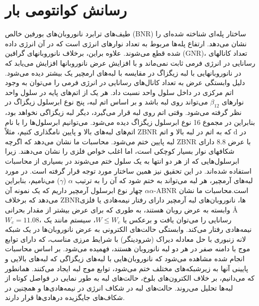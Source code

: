 \section{رسانش کوانتو‌‌می‌‌ بار}
طیف‌های ترابرد نانوروبان‌های ‌بورفین خالص (\gls{BNR}) ساختار پله‌ای شناخته شده‌ای را نشان ‌‌می‌‌دهد. ارتفاع پله‌ها مربوط به تعداد نوارهای انرژی است که در آن انرژی داده شده قطع ‌‌می‌‌شوند. علاوه بر‌این، برخلاف نانوروبانهای گرافین (\gls{GNR})، تعداد کانالهای رسانایی در انرژی فر‌‌می‌‌ ثابت نمی‌‌ماند و با افزایش عرض نانوروبانها افزایش ‌می‌‌یابد که در نانوروبانهایی با لبه زیگزاگ در مقایسه با لبه‌های ارمچیر یک بیشتر دیده ‌می‌شود. دلیل وابستگی عرض به تعداد کانال‌های رسانایی در انرژی فر‌‌می‌‌ را ‌‌می‌‌توان به وجود اتم مرکزی در داخل سلول واحد نسبت داد. هر یک از اتم‌های پایه در سلول واحد نوارهای $\beta_{12}$ ‌‌می‌‌تواند روی لبه باشد و بر اساس اتم لبه، پنج نوع ابرسلول زیگزاگ در نظر گرفته ‌‌می‌‌شود. وقتی اتم  روی لبه قرار ‌‌می‌‌گیرد، دیگر لبه زیگزاگی نخواهد بود، بنابراین در مجموع 16 نوع ابرسلول زیگزاگ دیده ‌‌می‌‌شود. ‌می‌توانیم ابرسلول‌ها را با نام اتم‌های لبه‌های بالا و پایین نامگذاری کنیم، مثلاً \gls{ZBNR} که به اتم  در لبه بالا و اتم d در لبه پایین ختم ‌می‌شود. محاسبات ما نشان ‌می‌دهد که اگرچه \gls{ZBNR} با عرض\lr{\AA} 8.8 دارای شکافهای نوار بسیار کوچکی است، اما اغلب خواص فلزی را نشان ‌می‌دهند. زیرا ابرسلول‌هایی که از هر دو انتها به یک سلول ختم ‌‌می‌‌شوند در بسیاری از محاسبات استفاده شده‌اند. در این تحقیق نیز همین ساختار مورد توجه قرار گرفته است. در مورد لبه‌های آرمچیر، هر لبه ‌‌می‌‌تواند به  ختم شود که آن را به ترتیب $\alpha$ ($\gamma$) ‌‌می‌‌نا‌میم، بنابراین چهار نوع ابرسلول آرمچیر داریم که یک نمونه آن $\alpha\alpha$-\gls{ABNR} است.محاسبات ما نشان ‌‌می‌‌دهد که برخلاف \gls{ZBNR}‌ها، نانوروبان‌های لبه آرمچیر دارای رفتار نیمه‌هادی یا فلزی وابسته به عرض روبان  هستند، به طوری که برای عرض بیشتر از مقدار بحرانی \AA $W_c = 11.08$، رسانایی را ‌‌می‌‌توان یافت و برعکس یا $W\leq W_c$، سیستم مانند یک نیمه‌هادی رفتار ‌‌می‌‌کند. وابستگی حالت‌های الکترونی به عرض نانوروبان‌ها در یک شبکه لانه زنبوری با حل معادله دیراک (شرودینگر) با شرایط مرزی مناسب، که دارای توابع موج با دامنه صفر در هر دو لبه نانوروبان هستند، فهمیده ‌‌می‌‌شود. بر اساس محاسبات انجام شده مشاهده ‌‌می‌‌شود که نانوروبان‌هایی با لبه‌های زیگزاگی که لبه‌های بالایی و پایینی آنها به زیرشبکه‌های مختلف ختم ‌‌می‌‌شود، توابع موج لبه ایجاد ‌‌می‌‌کنند. همانطور که ‌‌می‌‌دانیم، بر خلاف الکترون‌های بلوخ، حالت‌های لبه به طور نمایی در فواصل کوتاه از لبه‌ها تحلیل ‌‌می‌‌روند. حالت‌های لبه در شکاف انرژی در نیمه‌هادی‌ها و همچنین در شکاف‌های جایگزیده در‌هادی‌ها قرار دارند.

